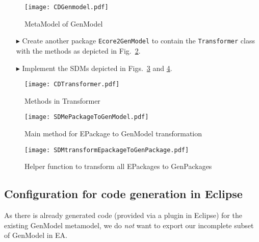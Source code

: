 \begin{figure}[htbp]
\begin{center}  
	\texttt{[image: CDGenmodel.pdf]}
	\caption{MetaModel of GenModel}  
\label{fig_gMM}
\end{center}
\end{figure} 

\begin{enumerate}  
\item[$\blacktriangleright$] Create another package \texttt{Ecore2GenModel} to contain the \texttt{Transformer} class with the methods as depicted in
Fig.~\ref{fig_e2gm}.

\item[$\blacktriangleright$] Implement the SDMs depicted in Figs.~\ref{fig_pack2gm} and \ref{fig_transf}.
\end{enumerate}

\begin{figure}[htbp]
\begin{center}  
\texttt{[image: CDTransformer.pdf]}
\caption{Methods in \textsf{Transformer}}  
\label{fig_e2gm}
\end{center}
\end{figure} 

\begin{figure}[htbp]
\begin{center}  \texttt{[image: SDMePackageToGenModel.pdf]}
        \caption{Main method for \textsf{EPackage} to \textsf{GenModel} transformation}  
  \label{fig_pack2gm}
\end{center}
\end{figure} 

\begin{figure}[htbp]
\begin{center}  
\texttt{[image: SDMtransformEpackageToGenPackage.pdf]}
\caption{Helper function to transform all \textsf{EPackages} to \textsf{GenPackages}}  
\label{fig_transf}
\end{center}
\end{figure} 



\subsection{Configuration for code generation in Eclipse}
\label{sec:Project Combination}

As there is already generated code (provided via a plugin in Eclipse) for the existing \textsf{GenModel} metamodel, we do \emph{not} want to export our
incomplete subset of \textsf{GenModel} in EA.

